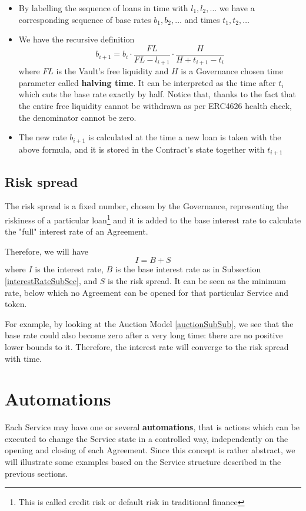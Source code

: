 \documentclass[a4paper,10 pt]{article}
\theoremstyle{definition}
\begin{document}
\begin{itemize}
\item By labelling the sequence of loans in time with $l_1, l_2, \ldots$ we have a corresponding sequence of base rates $b_1,b_2, \ldots$ and times $t_1, t_2, \ldots$
\item We have the recursive definition $$b_{i+1} = b_i \cdot \frac{FL}{FL-l_{i+1}}\cdot\frac{H}{H + t_{i+1} - t_i}$$ where $FL$ is the Vault's free liquidity and $H$ is a Governance chosen time parameter called {\bf halving time}. It can be interpreted as the time after $t_i$ which cuts the base rate exactly by half. Notice that, thanks to the fact that the entire free liquidity cannot be withdrawn as per ERC4626 health check, the denominator cannot be zero.
\item The new rate $b_{i+1}$ is calculated at the time a new loan is taken with the above formula, and it is stored in the Contract's state together with $t_{i+1}$
\end{itemize}

\subsection{Risk spread}\label{riskSpreadSubSec}

The risk spread is a fixed number, chosen by the Governance, representing the riskiness of a particular loan\footnote{This is called credit risk or default risk in traditional finance} and it is added to the base interest rate to calculate the "full" interest rate of an Agreement.

Therefore, we will have $$I = B + S$$ where $I$ is the interest rate, $B$ is the base interest rate as in Subsection \ref{interestRateSubSec}, and $S$ is the risk spread. It can be seen as the minimum rate, below which no Agreement can be opened for that particular Service and token.

For example, by looking at the Auction Model \ref{auctionSubSub}, we see that the base rate could also become zero after a very long time: there are no positive lower bounds to it. Therefore, the interest rate will converge to the risk spread with time.

\section{Automations}\label{automationsSec}
Each Service may have one or several {\bf automations}, that is actions which can be executed to change the Service state in a controlled way, independently on the opening and closing of each Agreement. Since this concept is rather abstract, we will illustrate some examples based on the Service structure described in the previous sections.
\end{document}

